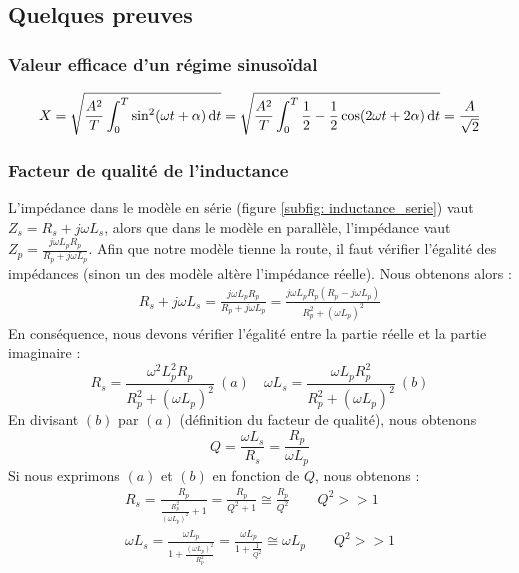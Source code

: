 \documentclass[12pt,a4paper]{article}
\begin{document}
\subsection{Quelques preuves}
\label{app: preuves}
\subsubsection{Valeur efficace d'un régime sinusoïdal}
\label{app: preuve valeur efficace}
\begin{equation}
	X = \sqrt{\frac{A^2}{T} \int_0^T \sin^2(\omega t + \alpha) \, \mathrm d t} = \sqrt{\frac{A^2}{T}\int_0^T \frac{1}{2} - \frac{1}{2}\cos(2\omega t + 2\alpha)\, \mathrm d t} = \frac{A}{\sqrt{2}}
\end{equation}
\subsubsection{Facteur de qualité de l'inductance}
\label{app: preuve facteur qualite inductance}
L'impédance dans le modèle en série (figure \ref{subfig: inductance_serie}) vaut $Z_s = R_s + j\omega L_s$, alors que dans le modèle en parallèle, l'impédance vaut $Z_p = \frac{j\omega L_p R_p}{R_p + j\omega L_p}$. Afin que notre modèle tienne la route, il faut vérifier l'égalité des impédances (sinon un des modèle altère l'impédance réelle). Nous obtenons alors :
\begin{align*}
	R_s + j\omega L_s = \frac{j\omega L_p R_p}{R_p + j\omega L_p} = \frac{j\omega L_p R_p(R_p - j\omega L_p)}{R_p^2 + (\omega L_p)^2}
\end{align*}
En conséquence, nous devons vérifier l'égalité entre la partie réelle et la partie imaginaire :
\begin{equation*}
	R_s = \frac{\omega^2 L_p^2 R_p}{R_p^2 + (\omega L_p)^2}\ (a) \quad \omega L_s = \frac{\omega L_p R_p^2}{R_p^2 + (\omega L_p)^2} \ (b)
\end{equation*}
En divisant $(b)$ par $(a)$ (définition du facteur de qualité), nous obtenons 
\[Q = \frac{\omega L_s}{R_s} = \frac{R_p}{\omega L_p}\]
Si nous exprimons $(a)$ et $(b)$ en fonction de $Q$, nous obtenons :
\begin{align*}
	R_s = \frac{R_p}{\frac{R_p^2}{(\omega L_p)^2} + 1} = \frac{R_p}{Q^2 + 1} \cong \frac{R_p}{Q^2} \qquad Q^2 >> 1\\
	\omega L_s = \frac{\omega L_p}{1 + \frac{(\omega L_p)^2}{R_p^2}} = \frac{\omega L_p}{1+\frac{1}{Q^2}} \cong \omega L_p \qquad Q^2 >> 1
\end{align*}
\end{document}
